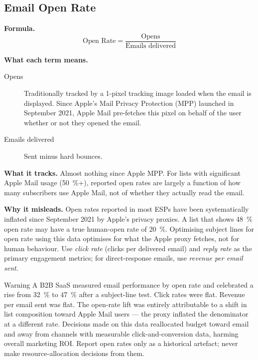 \subsection{Email Open Rate}

\textbf{Formula.}
\[
  \text{Open Rate} = \frac{\text{Opens}}{\text{Emails delivered}}
\]

\textbf{What each term means.}
\begin{description}
  \item[Opens] Traditionally tracked by a 1-pixel tracking image loaded when the email is
    displayed. Since Apple's Mail Privacy Protection (MPP) launched in September 2021,
    Apple Mail pre-fetches this pixel on behalf of the user whether or not they opened the
    email.
  \item[Emails delivered] Sent minus hard bounces.
\end{description}

\textbf{What it tracks.} Almost nothing since Apple MPP. For lists with significant Apple
Mail usage (\qty{50}{\percent}+), reported open rates are largely a function of how many
subscribers use Apple Mail, not of whether they actually read the email.

\textbf{Why it misleads.} Open rates reported in most ESPs have been systematically inflated
since September 2021 by Apple's privacy proxies. A list that shows \qty{48}{\percent} open
rate may have a true human-open rate of \qty{20}{\percent}. Optimising subject lines for
open rate using this data optimises for what the Apple proxy fetches, not for human
behaviour. Use \emph{click rate} (clicks per delivered email) and \emph{reply rate} as the
primary engagement metrics; for direct-response emails, use \emph{revenue per email sent}.

\begin{admonition}{Warning}
A B2B SaaS measured email performance by open rate and celebrated a rise from \qty{32}{\percent}
to \qty{47}{\percent} after a subject-line test. Click rates were flat. Revenue per email
sent was flat. The open-rate lift was entirely attributable to a shift in list composition
toward Apple Mail users --- the proxy inflated the denominator at a different rate. Decisions
made on this data reallocated budget toward email and away from channels with measurable
click-and-conversion data, harming overall marketing ROI. Report open rates only as a
historical artefact; never make resource-allocation decisions from them.
\end{admonition}


